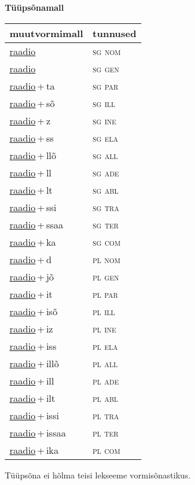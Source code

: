 
\vspace{1.8em}
\begin{minipage}{\textwidth}
\textbf{Tüüpsõnamall \,}\\

\begin{sideways}
\begin{tabular}{l l}
muutvormimall & tunnused \\
\hline
\underline{raadio} & \textsc{ sg nom } \\
\underline{raadio} & \textsc{ sg gen } \\
\underline{raadio}\,+\,ta & \textsc{ sg par } \\
\underline{raadio}\,+\,sõ & \textsc{ sg ill } \\
\underline{raadio}\,+\,z & \textsc{ sg ine } \\
\underline{raadio}\,+\,ss & \textsc{ sg ela } \\
\underline{raadio}\,+\,llõ & \textsc{ sg all } \\
\underline{raadio}\,+\,ll & \textsc{ sg ade } \\
\underline{raadio}\,+\,lt & \textsc{ sg abl } \\
\underline{raadio}\,+\,ssi & \textsc{ sg tra } \\
\underline{raadio}\,+\,ssaa & \textsc{ sg ter } \\
\underline{raadio}\,+\,ka & \textsc{ sg com } \\
\underline{raadio}\,+\,d & \textsc{ pl nom } \\
\underline{raadio}\,+\,jõ & \textsc{ pl gen } \\
\underline{raadio}\,+\,it & \textsc{ pl par } \\
\underline{raadio}\,+\,isõ & \textsc{ pl ill } \\
\underline{raadio}\,+\,iz & \textsc{ pl ine } \\
\underline{raadio}\,+\,iss & \textsc{ pl ela } \\
\underline{raadio}\,+\,illõ & \textsc{ pl all } \\
\underline{raadio}\,+\,ill & \textsc{ pl ade } \\
\underline{raadio}\,+\,ilt & \textsc{ pl abl } \\
\underline{raadio}\,+\,issi & \textsc{ pl tra } \\
\underline{raadio}\,+\,issaa & \textsc{ pl ter } \\
\underline{raadio}\,+\,ika & \textsc{ pl com } \\
\end{tabular}
\end{sideways}
\label{tab:tüüpsõnamall-raadio}

\end{minipage}

 
\vspace{1em}
\noindent Tüüpsõna ei hõlma teisi lekseeme vormi\-sõnastikus.
